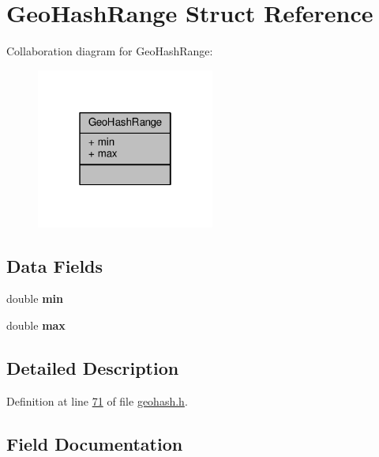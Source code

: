 \hypertarget{structGeoHashRange}{}\section{Geo\+Hash\+Range Struct Reference}
\label{structGeoHashRange}


Collaboration diagram for Geo\+Hash\+Range\+:\nopagebreak
\begin{figure}[H]
\begin{center}
\leavevmode
\includegraphics[width=166pt]{structGeoHashRange__coll__graph}
\end{center}
\end{figure}
\subsection*{Data Fields}
\begin{DoxyCompactItemize}
\item 
\mbox{\label{structGeoHashRange_a554624a58afd7784b4759b6b7aa51ce1}} 
double {\bfseries min}
\item 
\mbox{\label{structGeoHashRange_a78c4ead95251fc739ee1a136773ff262}} 
double {\bfseries max}
\end{DoxyCompactItemize}


\subsection{Detailed Description}


Definition at line \hyperlink{geohash_8h_source_l00071}{71} of file \hyperlink{geohash_8h_source}{geohash.\+h}.



\subsection{Field Documentation}
\mbox{\label{structGeoHashRange_a78c4ead95251fc739ee1a136773ff262}} 

